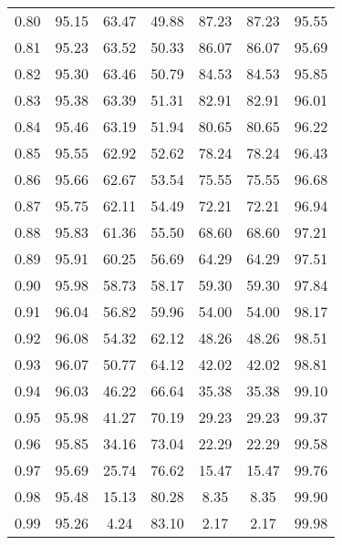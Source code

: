 \begin{tabular}{|c|c|c|c|c|c|c|}
      0.80 &     95.15 &     63.47 &      49.88 &   87.23 &      87.23 &         95.55 \\
      0.81 &     95.23 &     63.52 &      50.33 &   86.07 &      86.07 &         95.69 \\
      0.82 &     95.30 &     63.46 &      50.79 &   84.53 &      84.53 &         95.85 \\
      0.83 &     95.38 &     63.39 &      51.31 &   82.91 &      82.91 &         96.01 \\
      0.84 &     95.46 &     63.19 &      51.94 &   80.65 &      80.65 &         96.22 \\
      0.85 &     95.55 &     62.92 &      52.62 &   78.24 &      78.24 &         96.43 \\
      0.86 &     95.66 &     62.67 &      53.54 &   75.55 &      75.55 &         96.68 \\
      0.87 &     95.75 &     62.11 &      54.49 &   72.21 &      72.21 &         96.94 \\
      0.88 &     95.83 &     61.36 &      55.50 &   68.60 &      68.60 &         97.21 \\
      0.89 &     95.91 &     60.25 &      56.69 &   64.29 &      64.29 &         97.51 \\
      0.90 &     95.98 &     58.73 &      58.17 &   59.30 &      59.30 &         97.84 \\
      0.91 &     96.04 &     56.82 &      59.96 &   54.00 &      54.00 &         98.17 \\
      0.92 &     96.08 &     54.32 &      62.12 &   48.26 &      48.26 &         98.51 \\
      0.93 &     96.07 &     50.77 &      64.12 &   42.02 &      42.02 &         98.81 \\
      0.94 &     96.03 &     46.22 &      66.64 &   35.38 &      35.38 &         99.10 \\
      0.95 &     95.98 &     41.27 &      70.19 &   29.23 &      29.23 &         99.37 \\
      0.96 &     95.85 &     34.16 &      73.04 &   22.29 &      22.29 &         99.58 \\
      0.97 &     95.69 &     25.74 &      76.62 &   15.47 &      15.47 &         99.76 \\
      0.98 &     95.48 &     15.13 &      80.28 &    8.35 &       8.35 &         99.90 \\
      0.99 &     95.26 &      4.24 &      83.10 &    2.17 &       2.17 &         99.98 \\
\bottomrule
\end{tabular}
